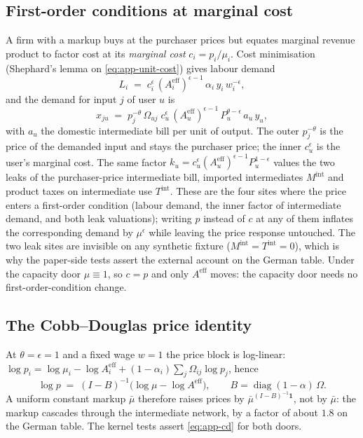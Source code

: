 \subsection{First-order conditions at marginal cost}\label{app:pricing-foc}
A firm with a markup buys at the purchaser prices but equates marginal revenue
product to factor cost at its \emph{marginal cost} $c_i = p_i/\mu_i$. Cost
minimisation (Shephard's lemma on \eqref{eq:app-unit-cost}) gives labour demand
\begin{equation}\label{eq:app-labour}
  L_i \;=\; c_i^{\epsilon}\,(A^{\mathrm{eff}}_i)^{\epsilon-1}\,\alpha_i\,y_i\,w_i^{-\epsilon},
\end{equation}
and the demand for input $j$ of user $u$ is
\begin{equation}\label{eq:app-intermediate}
  x_{ju} \;=\; p_j^{-\theta}\,\Omega_{uj}\;
     c_u^{\epsilon}\,(A^{\mathrm{eff}}_u)^{\epsilon-1}\,P_u^{\theta-\epsilon}\,a_u\,y_u ,
\end{equation}
with $a_u$ the domestic intermediate bill per unit of output. The outer
$p_j^{-\theta}$ is the price of the demanded input and stays the purchaser
price; the inner $c_u^{\epsilon}$ is the user's marginal cost. The same factor
$k_u = c_u^{\epsilon}(A^{\mathrm{eff}}_u)^{\epsilon-1}P_u^{1-\epsilon}$ values
the two leaks of the purchaser-price intermediate bill, imported
intermediates $M^{\mathrm{int}}$ and product taxes on intermediate use
$T^{\mathrm{int}}$. These are the four sites where the price enters a
first-order condition (labour demand, the inner factor of intermediate demand,
and both leak valuations); writing $p$ instead of $c$ at any of them inflates
the corresponding demand by $\mu^{\epsilon}$ while leaving the price response
untouched. The two leak sites are invisible on any synthetic fixture
($M^{\mathrm{int}} = T^{\mathrm{int}} = 0$), which is why the paper-side tests
assert the external account on the German table. Under the capacity door
$\mu \equiv 1$, so $c = p$ and only $A^{\mathrm{eff}}$ moves: the capacity door
needs no first-order-condition change.

\subsection{The Cobb--Douglas price identity}\label{app:pricing-cd}
At $\theta = \epsilon = 1$ and a fixed wage $w = 1$ the price block is
log-linear: $\log p_i = \log \mu_i - \log A^{\mathrm{eff}}_i
+ (1-\alpha_i)\sum_j \Omega_{ij}\log p_j$, hence
\begin{equation}\label{eq:app-cd}
  \log p \;=\; (I - B)^{-1}\bigl(\log \mu - \log A^{\mathrm{eff}}\bigr),
  \qquad B = \operatorname{diag}(1-\alpha)\,\Omega .
\end{equation}
A uniform constant markup $\bar\mu$ therefore raises prices by
$\bar\mu^{(I-B)^{-1}\mathbf 1}$, not by $\bar\mu$: the markup cascades through
the intermediate network, by a factor of about $1.8$ on the German table. The
kernel tests assert \eqref{eq:app-cd} for both doors.

